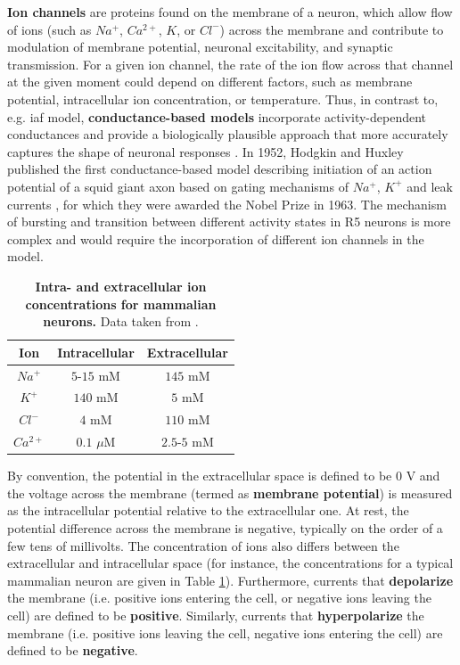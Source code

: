 \documentclass[../main.tex]{subfiles}
\begin{document}
\textbf{Ion channels} are proteins found on the membrane of a neuron, which allow flow of ions (such as $Na^+$, $Ca^{2+}$, $K$, or $Cl^-$) across the membrane and contribute to modulation of membrane potential, neuronal excitability, and synaptic transmission. For a given ion channel, the rate of the ion flow across that channel at the given moment could depend on different factors, such as membrane potential, intracellular ion concentration, or temperature. Thus, in contrast to, e.g. \gls{iaf} model, \textbf{conductance-based models} incorporate activity-dependent conductances and provide a biologically plausible approach that more accurately captures the shape of neuronal responses \parencite{destexheConductanceBasedIntegrateandFireModels1997}. In 1952, Hodgkin and Huxley published the first conductance-based model describing initiation of an action potential of a squid giant axon based on gating mechanisms of $Na^{+}$, $K^+$ and leak currents \parencite{hodgkinQuantitativeDescriptionMembrane1952}, for which they were awarded the Nobel Prize in 1963. The mechanism of bursting and transition between different activity states in R5 neurons is more complex and would require the incorporation of different ion channels in the model.

\begin{table}[!b]
    \centering
    \begin{tabular}{|c|c|c|}
        \hline
        Ion & Intracellular & Extracellular \\
        \hline
        \hline
        $Na^+$     & $5$-$15$ mM    & $145$ mM    \\
        $K^+$      & $140$ mM       & $5$ mM      \\
        $Cl^-$     & $4$ mM         & $110$ mM    \\
        $Ca^{2+}$  & $0.1$ $\mu$M   & $2.5$-$5$ mM \\
        \hline
    \end{tabular}
    \caption[Intra- and extracellular ion concentrations for mammalian neurons]{
        \textbf{Intra- and extracellular ion concentrations for mammalian neurons.}
        Data taken from \parencite{izhikevichDynamicalSystemsNeuroscience2006}.
    }
    \label{tab:typical_ion_concentrations_in_mammaly}
\end{table}

By convention, the potential in the extracellular space is defined to be $0$ V and the voltage across the membrane (termed as \textbf{membrane potential}) is measured as the intracellular potential relative to the extracellular one. At rest, the potential difference across the membrane is negative, typically on the order of a few tens of millivolts. The concentration of ions also differs between the extracellular and intracellular space (for instance, the concentrations for a typical mammalian neuron are given in Table \ref{tab:typical_ion_concentrations_in_mammaly}). Furthermore, currents that \textbf{depolarize} the membrane (i.e. positive ions entering the cell, or negative ions leaving the cell) are defined to be \textbf{positive}. Similarly, currents that \textbf{hyperpolarize} the membrane (i.e. positive ions leaving the cell, negative ions entering the cell) are defined to be \textbf{negative}.
\end{document}
